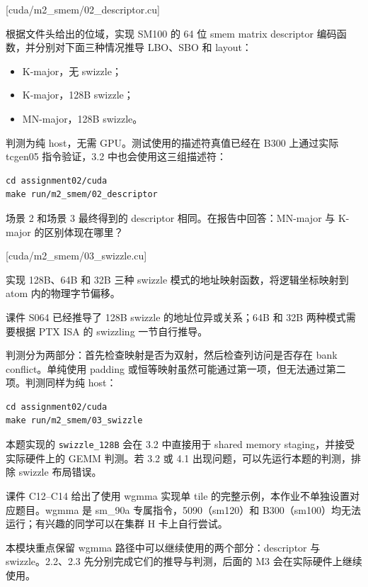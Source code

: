 \documentclass[11pt,a4paper,fontset=fandol]{ctexart}
\providecommand{\tightlist}{\setlength{\itemsep}{0pt}\setlength{\parskip}{0pt}}
\begin{document}
[cuda/m2\_smem/02\_descriptor.cu]

根据文件头给出的位域，实现 SM100 的 64 位 smem matrix descriptor
编码函数，并分别对下面三种情况推导 LBO、SBO 和 layout：

\begin{itemize}
\tightlist
\item
  K-major，无 swizzle；
\item
  K-major，128B swizzle；
\item
  MN-major，128B swizzle。
\end{itemize}

判测为纯 host，无需 GPU。测试使用的描述符真值已经在 B300 上通过实际
tcgen05 指令验证，3.2 中也会使用这三组描述符：

\begin{verbatim}
cd assignment02/cuda
make run/m2_smem/02_descriptor
\end{verbatim}

场景 2 和场景 3 最终得到的 descriptor 相同。在报告中回答：MN-major 与
K-major 的区别体现在哪里？

[cuda/m2\_smem/03\_swizzle.cu]

实现 128B、64B 和 32B 三种 swizzle 模式的地址映射函数，将逻辑坐标映射到
atom 内的物理字节偏移。

课件 S064 已经推导了 128B swizzle 的地址位异或关系；64B 和 32B
两种模式需要根据 PTX ISA 的 swizzling 一节自行推导。

判测分为两部分：首先检查映射是否为双射，然后检查列访问是否存在 bank
conflict。单纯使用 padding
或恒等映射虽然可能通过第一项，但无法通过第二项。判测同样为纯 host：

\begin{verbatim}
cd assignment02/cuda
make run/m2_smem/03_swizzle
\end{verbatim}

本题实现的 \texttt{swizzle\_128B} 会在 3.2 中直接用于 shared memory
staging，并接受实际硬件上的 GEMM 判测。若 3.2 或 4.1
出现问题，可以先运行本题的判测，排除 swizzle 布局错误。

\begin{lookback}

课件 C12--C14 给出了使用 wgmma 实现单 tile
的完整示例，本作业不单独设置对应题目。wgmma 是 sm\_90a
专属指令，5090（sm120）和
B300（sm100）均无法运行；有兴趣的同学可以在集群 H 卡上自行尝试。

本模块重点保留 wgmma 路径中可以继续使用的两个部分：descriptor 与
swizzle。2.2、2.3 先分别完成它们的推导与判测，后面的 M3
会在实际硬件上继续使用。

\end{lookback}
\end{document}
